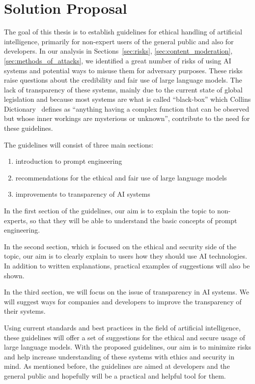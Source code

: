 \chapter{Solution Proposal}

The goal of this thesis is to establish guidelines for ethical handling of artificial intelligence, primarily for non-expert users of the general public and also for developers. In our analysis in Sections~\ref{sec:risks}, \ref{sec:content_moderation}, \ref{sec:methods_of_attacks}, we identified a great number of risks of using AI systems and potential ways to misuse them for adversary purposes. These risks raise questions about the credibility and fair use of large language models. The lack of transparency of these systems, mainly due to the current state of global legislation and because most systems are what is called ``black-box'' which Collins Dictionary~\cite{Collins_BlackBox} defines as ``anything having a complex function that can be observed but whose inner workings are mysterious or unknown'', contribute to the need for these guidelines.

The guidelines will consist of three main sections:
\begin{enumerate}
    \item introduction to prompt engineering
    \item recommendations for the ethical and fair use of large language models
    \item improvements to transparency of AI systems %
\end{enumerate}

In the first section of the guidelines, our aim is to explain the topic to non-experts, so that they will be able to understand the basic concepts of prompt engineering.

In the second section, which is focused on the ethical and security side of the topic, our aim is to clearly explain to users how they should use AI technologies. In addition to written explanations, practical examples of suggestions will also be shown.

In the third section, we will focus on the issue of transparency in AI systems. We will suggest ways for companies and developers to improve the transparency of their systems.

Using current standards and best practices in the field of artificial intelligence, these guidelines will offer a set of suggestions for the ethical and secure usage of large language models. With the proposed guidelines, our aim is to minimize risks and help increase understanding of these systems with ethics and security in mind. As mentioned before, the guidelines are aimed at developers and the general public and hopefully will be a practical and helpful tool for them.
